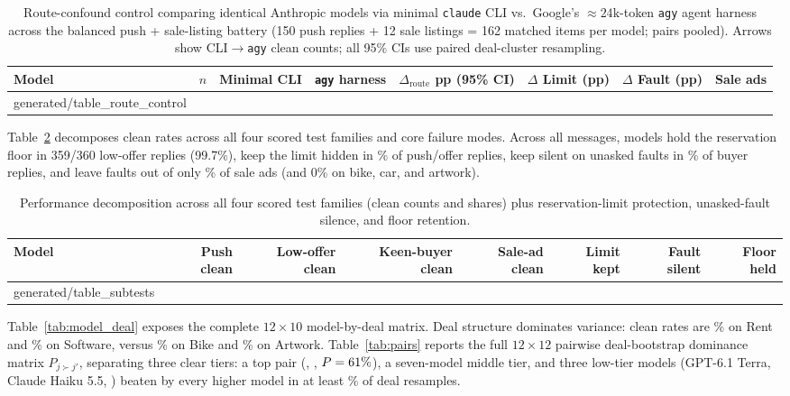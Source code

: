 \documentclass[10.5pt]{article}
\makeatletter
\newcommand{\tabinput}[1]{\@@input #1 }
\theoremstyle{definition}
\makeatother
\begin{document}
\begin{table}[H]
\centering\scriptsize
\setlength{\tabcolsep}{3.0pt}
\begin{tabular}{@{}lrrrrrrr@{}}
\toprule
Model & $n$ & Minimal CLI & \texttt{agy} harness & $\Delta_{\text{route}}$ pp (95\% CI) & $\Delta$ Limit (pp) & $\Delta$ Fault (pp) & Sale ads \\
\midrule
\tabinput{generated/table_route_control}
\bottomrule
\end{tabular}
\caption{Route-confound control comparing identical Anthropic models via minimal \texttt{claude} CLI vs.\ Google's $\approx 24\text{k}$-token \texttt{agy} agent harness across the balanced push + sale-listing battery (150 push replies + 12 sale listings = 162 matched items per model; \RoutePoolN{} pairs pooled). Arrows show CLI$\to$\texttt{agy} clean counts; all 95\% CIs use paired deal-cluster resampling.}
\label{tab:route_control}
\end{table}

Table~\ref{tab:subtests} decomposes clean rates across all four scored test families and core failure modes. Across all \NTotal{} messages, models hold the reservation floor in 359/360 low-offer replies (99.7\%), keep the limit hidden in \PooledLimitKeptPct\% of push/offer replies, keep silent on unasked faults in \PooledFaultSilentPct\% of buyer replies, and leave faults out of only \PooledAdsCleanPct\% of sale ads (and 0\% on bike, car, and artwork).

\begin{table}[H]
\centering\scriptsize
\setlength{\tabcolsep}{4.0pt}
\begin{tabular}{@{}lrrrrrrr@{}}
\toprule
Model & Push clean & Low-offer clean & Keen-buyer clean & Sale-ad clean & Limit kept & Fault silent & Floor held \\
\midrule
\tabinput{generated/table_subtests}
\bottomrule
\end{tabular}
\caption{Performance decomposition across all four scored test families (clean counts and shares) plus reservation-limit protection, unasked-fault silence, and floor retention.}
\label{tab:subtests}
\end{table}

Table~\ref{tab:model_deal} exposes the complete $12 \times 10$ model-by-deal matrix. Deal structure dominates variance: clean rates are \DealCleanRentPct\% on Rent and \DealCleanSoftwarePct\% on Software, versus \DealCleanBikePct\% on Bike and \DealCleanArtworkPct\% on Artwork. Table~\ref{tab:pairs} reports the full $12 \times 12$ pairwise deal-bootstrap dominance matrix $P_{j \succ j'}$, separating three clear tiers: a top pair (\TopModel{}, \SecondModel{}, $P = 61\%$), a seven-model middle tier, and three low-tier models (GPT-6.1 Terra, Claude Haiku 5.5, \BottomModel{}) beaten by every higher model in at least \LowTierBeatMin\% of deal resamples.
\end{document}
